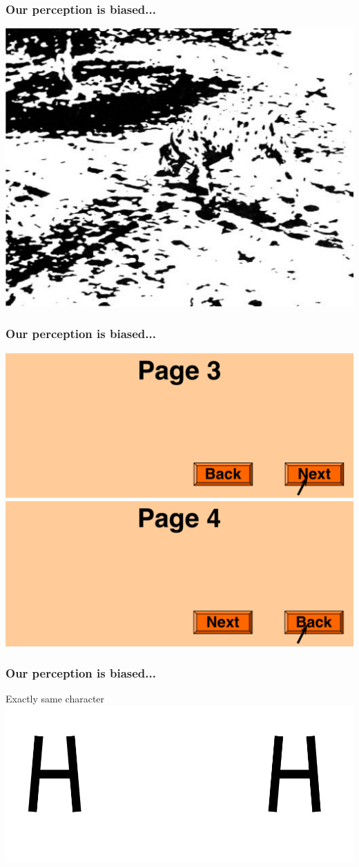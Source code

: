 \documentclass{beamer}
\begin{document}
\begin{frame}
\frametitle{Our perception is biased...}
\includegraphics[width=0.8\linewidth]{image/perception1}
\end{frame}

\begin{frame}
\frametitle{Our perception is biased...}
\centering
\includegraphics[width=0.6\linewidth]{image/perception3}
\vfill
\includegraphics[width=0.6\linewidth]{image/perception2}
\end{frame}

\begin{frame}
\frametitle{Our perception is biased...}
Exactly same character
\centering
\includegraphics[width=0.8\linewidth]{image/perception4}
\end{frame}
\end{document}
